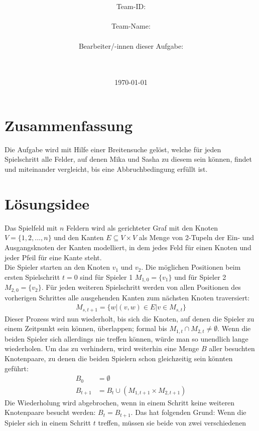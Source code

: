 \documentclass[a4paper,10pt,ngerman]{scrartcl}
\title{\textbf{\Huge\Aufgabe}}
\author{\LARGE Team-ID: \LARGE \TeamId \\\\
  \LARGE Team-Name: \LARGE \TeamName \\\\
  \LARGE Bearbeiter/-innen dieser Aufgabe: \\
  \LARGE \Namen\\\\}
\date{\LARGE\today}
\begin{document}
\maketitle
\tableofcontents

\vspace{0.5cm}

\section{Zusammenfassung}
Die Aufgabe wird mit Hilfe einer Breitensuche gelöst, welche für jeden
Spielschritt alle Felder, auf denen Mika und Sasha zu diesem sein können,
findet und miteinander vergleicht, bis eine Abbruchbedingung erfüllt ist.
\section{Lösungsidee}
Das Spielfeld mit $n$ Feldern wird als gerichteter Graf mit den Knoten
$V=\{1,2,...,n\}$ und den Kanten $E \subseteq V \times V$ als Menge von
2-Tupeln der Ein- und Ausgangsknoten der Kanten modelliert, in dem jedes Feld
für einen Knoten und jeder Pfeil für eine Kante steht. \\ Die Spieler starten
an den Knoten $v_1$ und $v_2$. Die möglichen Positionen beim ersten
Spielschritt $t=0$ sind für Spieler 1 $M_{1,0}=\{v_1\}$ und für Spieler 2
$M_{2,0}=\{v_2\}$. Für jeden weiteren Spielschritt werden von allen Positionen
des vorherigen Schrittes alle ausgehenden Kanten zum nächsten Knoten
traversiert:
\begin{align*}
  M_{s,t+1} = \{w | (v, w) \in E | v \in M_{s, t}\}
\end{align*}
Dieser Prozess wird nun wiederholt, bis sich die Knoten, auf denen die Spieler zu einem Zeitpunkt sein können, überlappen;
formal bis $M_{1, t} \cap M_{2, t} \neq \emptyset$. Wenn die beiden Spieler sich allerdings nie treffen können, würde man so
unendlich lange wiederholen. Um das zu verhindern, wird weiterhin eine Menge $B$ aller besuchten Knotenpaare, zu denen die
beiden Spielern schon gleichzeitig sein könnten geführt:
\begin{align*}
  B_0     & = \emptyset                                \\
  B_{t+1} & = B_{t} \cup (M_{1,t+1} \times M_{2, t+1})
\end{align*}
Die Wiederholung wird abgebrochen, wenn in einem Schritt keine weiteren Knotenpaare besucht werden: $B_t = B_{t+1}$.
Das hat folgenden Grund: Wenn die Spieler sich in einem Schritt $t$ treffen, müssen sie beide von zwei verschiedenen
\end{document}
